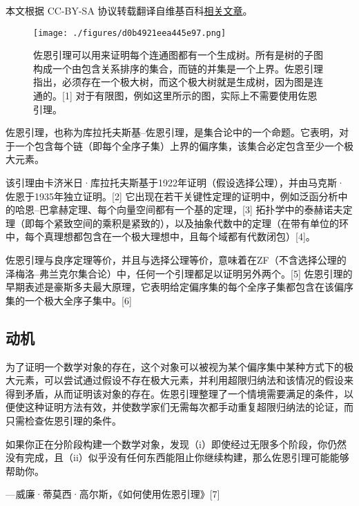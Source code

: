 
本文根据 CC-BY-SA 协议转载翻译自维基百科\href{https://en.wikipedia.org/wiki/Zorn\%27s_lemma}{相关文章}。

\begin{figure}[ht]
\centering
\texttt{[image: ./figures/d0b4921eea445e97.png]}
\caption{佐恩引理可以用来证明每个连通图都有一个生成树。所有是树的子图构成一个由包含关系排序的集合，而链的并集是一个上界。佐恩引理指出，必须存在一个极大树，而这个极大树就是生成树，因为图是连通的。[1] 对于有限图，例如这里所示的图，实际上不需要使用佐恩引理。} \label{fig_ZornS_1}
\end{figure}
佐恩引理，也称为库拉托夫斯基–佐恩引理，是集合论中的一个命题。它表明，对于一个包含每个链（即每个全序子集）上界的偏序集，该集合必定包含至少一个极大元素。

该引理由卡济米日·库拉托夫斯基于1922年证明（假设选择公理），并由马克斯·佐恩于1935年独立证明。[2] 它出现在若干关键性定理的证明中，例如泛函分析中的哈恩–巴拿赫定理、每个向量空间都有一个基的定理，[3] 拓扑学中的泰赫诺夫定理（即每个紧致空间的乘积是紧致的），以及抽象代数中的定理（在带有单位的环中，每个真理想都包含在一个极大理想中，且每个域都有代数闭包）[4]。

佐恩引理与良序定理等价，并且与选择公理等价，意味着在ZF（不含选择公理的泽梅洛–弗兰克尔集合论）中，任何一个引理都足以证明另外两个。[5] 佐恩引理的早期表述是豪斯多夫最大原理，它表明给定偏序集的每个全序子集都包含在该偏序集的一个极大全序子集中。[6]
\subsection{动机}  
为了证明一个数学对象的存在，这个对象可以被视为某个偏序集中某种方式下的极大元素，可以尝试通过假设不存在极大元素，并利用超限归纳法和该情况的假设来得到矛盾，从而证明该对象的存在。佐恩引理整理了一个情境需要满足的条件，以便使这种证明方法有效，并使数学家们无需每次都手动重复超限归纳法的论证，而只需检查佐恩引理的条件。

如果你正在分阶段构建一个数学对象，发现（i）即使经过无限多个阶段，你仍然没有完成，且（ii）似乎没有任何东西能阻止你继续构建，那么佐恩引理可能能够帮助你。

— 威廉·蒂莫西·高尔斯，《如何使用佐恩引理》[7]
